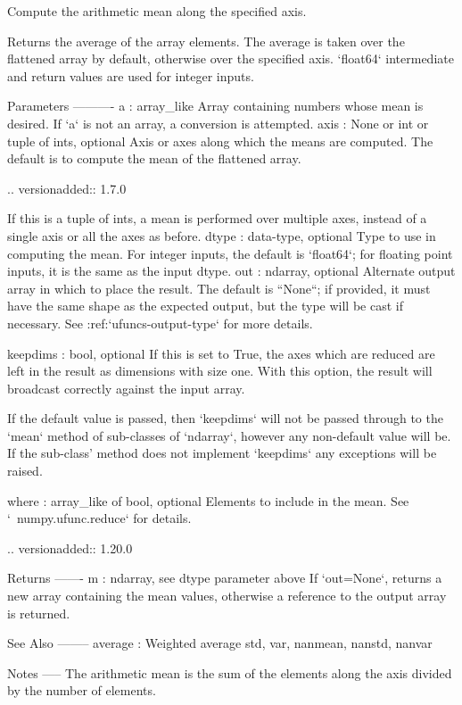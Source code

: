 \begin{DoxyVerb}Compute the arithmetic mean along the specified axis.

Returns the average of the array elements.  The average is taken over
the flattened array by default, otherwise over the specified axis.
`float64` intermediate and return values are used for integer inputs.

Parameters
----------
a : array_like
    Array containing numbers whose mean is desired. If `a` is not an
    array, a conversion is attempted.
axis : None or int or tuple of ints, optional
    Axis or axes along which the means are computed. The default is to
    compute the mean of the flattened array.

    .. versionadded:: 1.7.0

    If this is a tuple of ints, a mean is performed over multiple axes,
    instead of a single axis or all the axes as before.
dtype : data-type, optional
    Type to use in computing the mean.  For integer inputs, the default
    is `float64`; for floating point inputs, it is the same as the
    input dtype.
out : ndarray, optional
    Alternate output array in which to place the result.  The default
    is ``None``; if provided, it must have the same shape as the
    expected output, but the type will be cast if necessary.
    See :ref:`ufuncs-output-type` for more details.

keepdims : bool, optional
    If this is set to True, the axes which are reduced are left
    in the result as dimensions with size one. With this option,
    the result will broadcast correctly against the input array.

    If the default value is passed, then `keepdims` will not be
    passed through to the `mean` method of sub-classes of
    `ndarray`, however any non-default value will be.  If the
    sub-class' method does not implement `keepdims` any
    exceptions will be raised.

where : array_like of bool, optional
    Elements to include in the mean. See `~numpy.ufunc.reduce` for details.

    .. versionadded:: 1.20.0

Returns
-------
m : ndarray, see dtype parameter above
    If `out=None`, returns a new array containing the mean values,
    otherwise a reference to the output array is returned.

See Also
--------
average : Weighted average
std, var, nanmean, nanstd, nanvar

Notes
-----
The arithmetic mean is the sum of the elements along the axis divided
by the number of elements.


\end{DoxyVerb}
